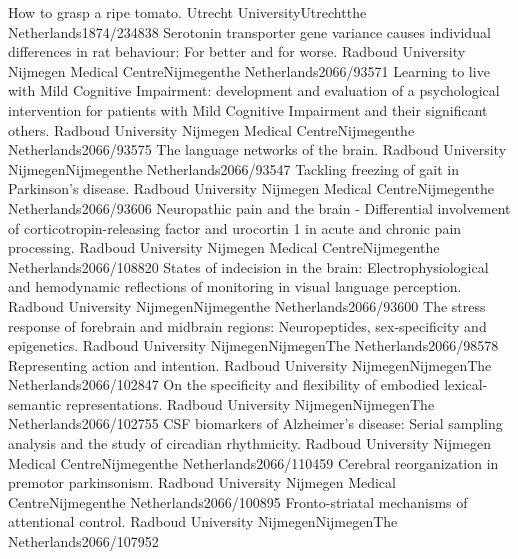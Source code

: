 	{How to grasp a ripe tomato.}
	{Utrecht University}{Utrecht}{the Netherlands}{1874/234838}
	{Serotonin transporter gene variance causes individual differences in rat behaviour: For better and for worse.}
	{Radboud University Nijmegen Medical Centre}{Nijmegen}{the Netherlands}{2066/93571}
	{Learning to live with Mild Cognitive Impairment: development and evaluation of a psychological intervention for patients with Mild Cognitive Impairment and their significant others.}
	{Radboud University Nijmegen Medical Centre}{Nijmegen}{the Netherlands}{2066/93575}
	{The language networks of the brain.}
	{Radboud University Nijmegen}{Nijmegen}{the Netherlands}{2066/93547}
	{Tackling freezing of gait in Parkinson's disease.}
	{Radboud University Nijmegen Medical Centre}{Nijmegen}{the Netherlands}{2066/93606}
	{Neuropathic pain and the brain - Differential involvement of corticotropin-releasing factor and urocortin 1 in acute and chronic pain processing.}
	{Radboud University Nijmegen Medical Centre}{Nijmegen}{the Netherlands}{2066/108820}
	{States of indecision in the brain: Electrophysiological and hemodynamic reflections of monitoring in visual language perception.}
	{Radboud University Nijmegen}{Nijmegen}{the Netherlands}{2066/93600}
	{The stress response of forebrain and midbrain regions: Neuropeptides, sex-specificity and epigenetics.}
	{Radboud University Nijmegen}{Nijmegen}{The Netherlands}{2066/98578}
	{Representing action and intention.}
	{Radboud University Nijmegen}{Nijmegen}{The Netherlands}{2066/102847}
	{On the specificity and flexibility of embodied lexical-semantic representations.}
	{Radboud University Nijmegen}{Nijmegen}{The Netherlands}{2066/102755}
	{ CSF biomarkers of Alzheimer's disease: Serial sampling analysis and the study of circadian rhythmicity.}
	{Radboud University Nijmegen Medical Centre}{Nijmegen}{the Netherlands}{2066/110459}
	{Cerebral reorganization in premotor parkinsonism.}
	{Radboud University Nijmegen Medical Centre}{Nijmegen}{the Netherlands}{2066/100895}
	{Fronto-striatal mechanisms of attentional control.}
	{Radboud University Nijmegen}{Nijmegen}{The Netherlands}{2066/107952}

